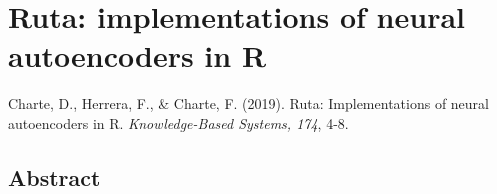 \documentclass[
	fontsize=11pt, %
	twoside=false, %
	open=any, %
	secnumdepth=1, %
]{kaobook}
\begin{document}


\addtocounter{chapter}{1}
\renewcommand*{\thechapter}{\Roman{chapter}}
\chapter{Ruta: implementations of neural autoencoders in R}

\begin{widepar}
  \begin{kaobox}[frametitle=Source]
    Charte, D., Herrera, F., \& Charte, F. (2019). Ruta: Implementations of neural autoencoders in R.  \textit{Knowledge-Based Systems, 174}, 4-8.
  \end{kaobox}
\end{widepar}




  \section*{Abstract}
\end{document}
